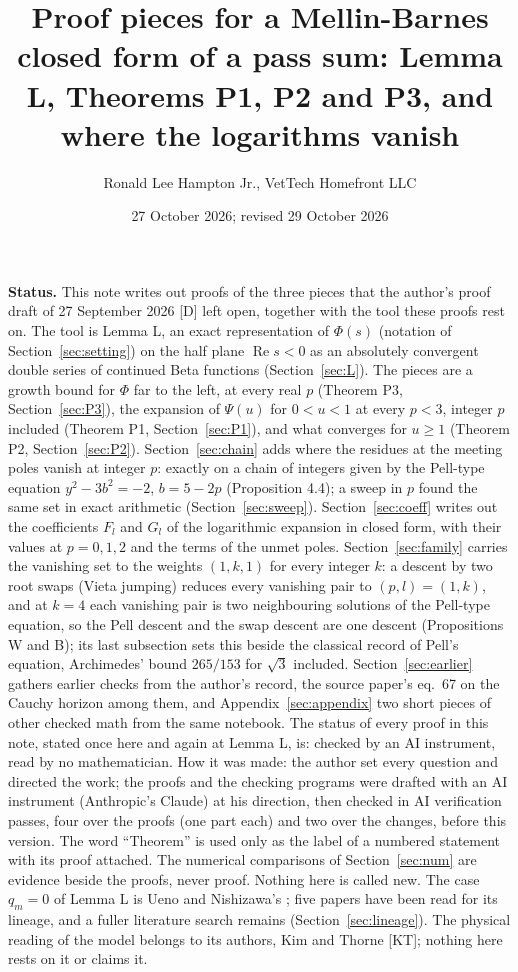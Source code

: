\documentclass[11pt]{article}
\title{Proof pieces for a Mellin-Barnes closed form of a pass sum: Lemma L, Theorems P1, P2 and P3, and where the logarithms vanish}
\author{Ronald Lee Hampton Jr., VetTech Homefront LLC}
\date{27 October 2026; revised 29 October 2026}
\newcommand{\re}{\operatorname{Re}}
\begin{document}
\maketitle

\noindent\textbf{Status.} This note writes out proofs of the three pieces that the author's proof draft of 27 September 2026 [D] left open, together with the tool these proofs rest on. The tool is Lemma L, an exact representation of $\Phi(s)$ (notation of Section~\ref{sec:setting}) on the half plane $\re s<0$ as an absolutely convergent double series of continued Beta functions (Section~\ref{sec:L}). The pieces are a growth bound for $\Phi$ far to the left, at every real $p$ (Theorem P3, Section~\ref{sec:P3}), the expansion of $\Psi(u)$ for $0<u<1$ at every $p<3$, integer $p$ included (Theorem P1, Section~\ref{sec:P1}), and what converges for $u\ge1$ (Theorem P2, Section~\ref{sec:P2}). Section~\ref{sec:chain} adds where the residues at the meeting poles vanish at integer $p$: exactly on a chain of integers given by the Pell-type equation $y^2-3b^2=-2$, $b=5-2p$ (Proposition 4.4); a sweep in $p$ found the same set in exact arithmetic (Section~\ref{sec:sweep}). Section~\ref{sec:coeff} writes out the coefficients $F_l$ and $G_l$ of the logarithmic expansion in closed form, with their values at $p=0,1,2$ and the terms of the unmet poles. Section~\ref{sec:family} carries the vanishing set to the weights $(1,k,1)$ for every integer $k$: a descent by two root swaps (Vieta jumping) reduces every vanishing pair to $(p,l)=(1,k)$, and at $k=4$ each vanishing pair is two neighbouring solutions of the Pell-type equation, so the Pell descent and the swap descent are one descent (Propositions W and B); its last subsection sets this beside the classical record of Pell's equation, Archimedes' bound $265/153$ for $\sqrt3$ included. Section~\ref{sec:earlier} gathers earlier checks from the author's record, the source paper's eq.~67 on the Cauchy horizon among them, and Appendix~\ref{sec:appendix} two short pieces of other checked math from the same notebook. The status of every proof in this note, stated once here and again at Lemma L, is: checked by an AI instrument, read by no mathematician. How it was made: the author set every question and directed the work; the proofs and the checking programs were drafted with an AI instrument (Anthropic's Claude) at his direction, then checked in AI verification passes, four over the proofs (one part each) and two over the changes, before this version. The word ``Theorem'' is used only as the label of a numbered statement with its proof attached. The numerical comparisons of Section~\ref{sec:num} are evidence beside the proofs, never proof. Nothing here is called new. The case $q_m=0$ of Lemma L is Ueno and Nishizawa's \cite{UN}; five papers have been read for its lineage, and a fuller literature search remains (Section~\ref{sec:lineage}). The physical reading of the model belongs to its authors, Kim and Thorne [KT]; nothing here rests on it or claims it.
\end{document}
